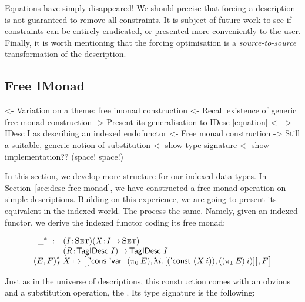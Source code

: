 Equations have simply disappeared! We should precise that forcing a
description is not guaranteed to remove all constraints. It is subject
of future work to see if constraints can be entirely eradicated, or
presented more conveniently to the user. Finally, it is worth
mentioning that the forcing optimisation is a \emph{source-to-source}
transformation of the description.

\subsection{Free IMonad}

\begin{wstructure}
<- Variation on a theme: free imonad construction
    <- Recall existence of generic free monad construction
    -> Present its generalisation to IDesc [equation]
        <- \I -> IDesc I as describing an indexed endofunctor
        <- Free monad construction
    -> Still a suitable, generic notion of substitution
        <- show type signature
        <- show implementation?? (space! space!)
\end{wstructure}

In this section, we develop more structure for our indexed
data-types. In Section~\ref{sec:desc-free-monad}, we have constructed
a free monad operation on simple descriptions. Building on this
experience, we are going to present its equivalent in the indexed
world. The process the same. Namely, given an indexed functor, we
derive the indexed functor coding its free monad:

\[\stk{
\begin{array}{ll}
\FreeIMonad{\_}{} : & \PITEL{\V{I}}{\Set}
                      \PITEL{\V{X}}{\V{I} \To \Set} \\
                    & \PITEL{\V{R}}{\TagIDesc{I}} \To
                      \TagIDesc{I}
\end{array} \\
\FreeIMonad{(E,F)}{I}{X} \mapsto
    \pair{\pair{\ListCons{\DVar{}}{(\fst{E})}} 
               {\LAM{i}
                \pair{(\DConst{(X\: i)})}
                     {((\snd{E})\: i)}{}}{}}
         {F}{}
}\]

Just as in the universe of descriptions, this construction comes with
an obvious \return and a substitution operation, the \bind. Its type
signature is the following:

\newcommand{\substI}{\F{substI}}

